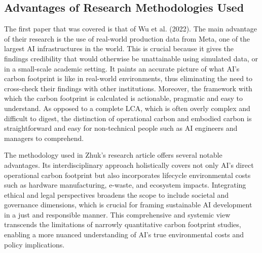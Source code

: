 \documentclass[a4paper, 12pt]{article}
\begin{document}
\subsection{Advantages of Research Methodologies Used}
\hspace{24pt}The first paper that was covered is that of Wu et al. (2022). The main advantage of their research is the use of real-world production data from Meta, one of the largest AI infrastructures in the world. This is crucial because it gives the findings credibility that would otherwise be unattainable using simulated data, or in a small-scale academic setting. It paints an accurate picture of what AI's carbon footprint is like in real-world environments, thus eliminating the need to cross-check their findings with other institutions. Moreover, the framework with which the carbon footprint is calculated is actionable, pragmatic and easy to understand. As opposed to a complete LCA, which is often overly complex and difficult to digest, the distinction of operational carbon and embodied carbon is straightforward and easy for non-technical people such as AI engineers and managers to comprehend.

\hspace{24pt} The methodology used in Zhuk's research article offers several notable advantages. Its interdisciplinary approach holistically covers not only AI's direct operational carbon footprint but also incorporates lifecycle environmental costs such as hardware manufacturing, e-waste, and ecosystem impacts. Integrating ethical and legal perspectives broadens the scope to include societal and governance dimensions, which is crucial for framing sustainable AI development in a just and responsible manner. This comprehensive and systemic view transcends the limitations of narrowly quantitative carbon footprint studies, enabling a more nuanced understanding of AI's true environmental costs and policy implications.
\end{document}
